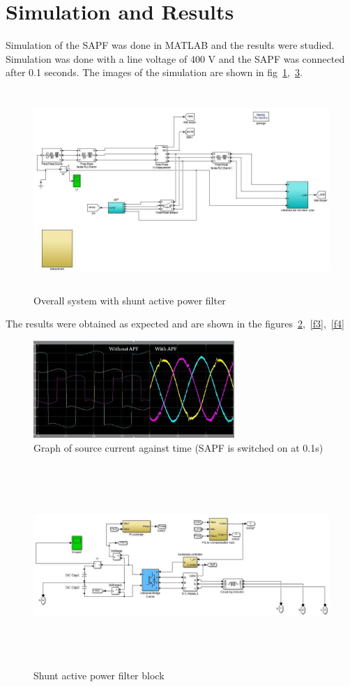 \documentclass[journal,twoside]{IEEEtran}
\begin{document}
	\section{Simulation and Results}
Simulation of the SAPF was done in MATLAB and the
results were studied. Simulation was done with a line voltage
of 400 V and the SAPF was connected after 0.1 seconds. The
images of the simulation are shown in fig~\ref{a1},~\ref{a2}.
\begin{figure}[!ht]
\centering
\includegraphics[height=3in , angle =90]{a1}
\caption{Overall system with shunt active power filter}
\label{a1}
\end{figure}

The results were obtained as expected and are shown in the figures~\ref{f2},~\ref{f3},~\ref{f4}
\begin{figure}[!htbp]
\centering
\includegraphics[width=3in]{2}
\caption{Graph of source current against time (SAPF is switched on at
0.1s)}
\label{f2}
\end{figure}

\begin{figure}[H]
\centering
\includegraphics[height=3in, angle =90]{a2}
\caption{Shunt active power filter block}
\label{a2}
\end{figure}
\end{document}
